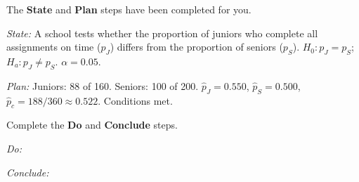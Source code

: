 \documentclass[10pt]{article}
\begin{document}
\namedateperiod

\vspace{0.15in}

The \textbf{State} and \textbf{Plan} steps have been completed for you.

\textit{State:} A school tests whether the proportion of juniors who complete
all assignments on time ($p_J$) differs from the proportion of seniors ($p_S$).
$H_0: p_J = p_S$; $H_a: p_J \ne p_S$. $\alpha = 0.05$.

\textit{Plan:} Juniors: 88 of 160. Seniors: 100 of 200.
$\hat p_J = 0.550$, $\hat p_S = 0.500$, $\hat p_c = 188/360 \approx 0.522$. Conditions met.

Complete the \textbf{Do} and \textbf{Conclude} steps.

\textit{Do:}

\textit{Conclude:}
\end{document}
